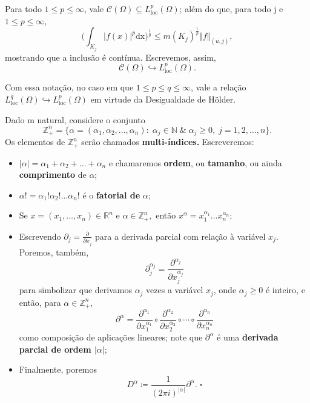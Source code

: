 \documentclass[../distribution_theory_notes.tex]{subfiles}
\begin{document}
   \begin{tcolorbox}[
   skin=enhanced,
   title=Observação,
   fonttitle=\bfseries,
 colframe=black,
   colbacktitle=cyan!75!white, 
   colback=cyan!15,
   colbacklower=black,
 coltitle=black,
   drop fuzzy shadow,
   ]
   Para todo \(1\leq p\leq \infty\), vale \(\mathcal{C}(\Omega )\subseteq L_{\mathrm{loc}}^{p}(\Omega )\); além do que, para todo j e \(1\leq p\leq \infty\), 
     \[
       \biggl(\int_{K_{j}}^{}|f(x)|^{p} \mathrm{dx}\biggr)^{\frac{1}{p}}\leq m(K_{j})^{\frac{1}{p}}\Vert f \Vert_{(u, j)},
     \]
     mostrando que a inclusão é contínua. Escrevemos, assim, 
       \[
         \mathcal{C}(\Omega )\hookrightarrow L_{\mathrm{loc}}^{p}(\Omega ).
       \]
        
       Com essa notação, no caso em que \(1\leq p\leq q\leq \infty\), vale a relação \(L_{\mathrm{loc}}^{q}(\Omega )\hookrightarrow L_{\mathrm{loc}}^{p}(\Omega )\) em virtude da Desigualdade de Hölder.
   \end{tcolorbox}

  \begin{def*}
    Dado m natural, considere o conjunto 
      \[
        \mathbb{Z}_{+}^{n}=\{\alpha = (\alpha_1, \alpha_2, \dotsc , \alpha_{n}):\; \alpha_{j}\in \mathbb{N}\;\&\; \alpha_{j}\geq 0,\; j=1,2,\dotsc ,n\}.
      \]
      Os elementos de \(\mathbb{Z}_{+}^{n}\) serão chamados \textbf{multi-índices.} Escreveremos: 
     \begin{itemize}
       \item \(|\alpha |=\alpha_1+\alpha_2+\dotsc +\alpha_{n}\) e chamaremos \textbf{ordem}, ou \textbf{tamanho}, ou ainda \textbf{comprimento} de \(\alpha\);
       \item \(\alpha! = \alpha_1!\alpha_2!\dotsc \alpha_{n}!\) é o \textbf{fatorial de} \(\alpha \);
       \item Se \(x=(x_1,\dotsc ,x_{n})\in \mathbb{R}^{n}\) e \(\alpha\in \mathbb{Z}_{+}^{n},\) então \(x^{\alpha }=x_{1}^{\alpha_1}\dotsc x_{n}^{\alpha_{n}}\);
       \item Escrevendo \(\partial_{j}=\frac{\partial^{}}{\partial x_{j}^{}}\) para a derivada parcial com relação à variável \(x_{j}\). Poremos, também, 
         \[
           \partial_{j}^{\alpha_{j}}=\frac{\partial^{\alpha_{j}}}{\partial x_{j}^{\alpha_{j}}}
         \]
         para simbolizar que derivamos \(\alpha_{j}\) vezes a variável \(x_{j}\), onde \(\alpha_{j}\geq 0\) é inteiro, e então, para \(\alpha \in \mathbb{Z}_{+}^{n},\)
           \[
             \partial^{\alpha } = \frac{\partial^{\alpha_1}}{\partial x_1^{\alpha_1}}\circ \frac{\partial^{\alpha_2}}{\partial x_2^{\alpha_2}}\circ\cdots\circ \frac{\partial^{\alpha_n}}{\partial x_n^{\alpha_n}}
           \]
           como composição de aplicações lineares; note que \(\partial^{\alpha }\) é uma \textbf{derivada parcial de ordem \(|\alpha |\)};
         \item Finalmente, poremos 
           \[
             D^{\alpha }\coloneqq \frac{1}{(2\pi i)^{|\alpha |}}\partial^{\alpha }.\;\square
           \]
     \end{itemize} 
  \end{def*}
\end{document}

